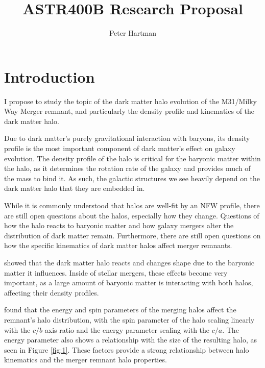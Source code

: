 \documentclass[linenumbers]{aastex631}
\begin{document}
\title{ASTR400B Research Proposal}

\author{Peter Hartman}

\section{Introduction} \label{sec:intro}
I propose to study the topic of the dark matter halo evolution of the M31/Milky Way Merger remnant, and particularly the density profile and kinematics of the dark matter halo.

Due to dark matter's purely gravitational interaction with baryons, its density profile is the most important component of dark matter's effect on galaxy evolution. The density profile of the halo is critical for the baryonic matter within the halo, as it determines the rotation rate of the galaxy and provides much of the mass to bind it. As such, the galactic structures we see heavily depend on the dark matter halo that they are embedded in.

While it is commonly understood that halos are well-fit by an NFW profile, there are still open questions about the halos, especially how they change. Questions of how the halo reacts to baryonic matter and how galaxy mergers alter the distribution of dark matter remain. Furthermore, there are still open questions on how the specific kinematics of dark matter halos affect merger remnants.

\cite{Abadi} showed that the dark matter halo reacts and changes shape due to the baryonic matter it influences. Inside of stellar mergers, these effects become very important, as a large amount of baryonic matter is interacting with both halos, affecting their density profiles.

\cite{DrakosA} found that the energy and spin parameters of the merging halos affect the remnant's halo distribution, with the spin parameter of the halo scaling linearly with the $c/b$ axis ratio and the energy parameter scaling with the $c/a$. The energy parameter also shows a relationship with the size of the resulting halo, as seen in Figure \ref{fig:1}. These factors provide a strong relationship between halo kinematics and the merger remnant halo properties.
\end{document}
